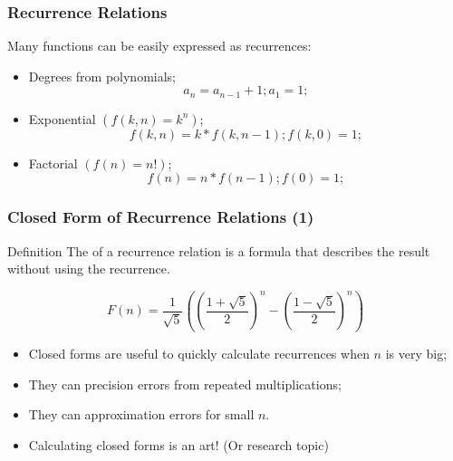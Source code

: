 \documentclass{beamer}
\begin{document}
\begin{frame}
  \frametitle{Recurrence Relations}
  \begin{block}{}
    {\small Many functions can be easily expressed as recurrences:}
  \end{block}
  \begin{itemize}
  \item Degrees from polynomials;
    \begin{equation*}
      a_n = a_{n-1} + 1; a_1 = 1;
    \end{equation*}
  \item Exponential $(f(k,n) = k^n)$;
    \begin{equation*}
      f(k,n) = k*f(k,n-1); f(k,0) = 1;
    \end{equation*}
  \item Factorial $(f(n) = n!)$;
    \begin{equation*}
      f(n) = n*f(n-1); f(0) = 1;
    \end{equation*}
  \end{itemize}
\end{frame}

\begin{frame}
  \frametitle{Closed Form of Recurrence Relations (1)}
  \begin{block}{Definition}
    {\small
    The  of a recurrence relation is a formula
    that describes the result without using the recurrence.
    }
  \end{block}
  \begin{equation*}
     F(n) = \frac{1}{\sqrt{5}}\left(\left(\frac{1+\sqrt{5}}{2}\right)^n - \left(\frac{1-\sqrt{5}}{2}\right)^n\right)
  \end{equation*}
  \vfill
  {\small
  \begin{itemize}    
  \item Closed forms are useful to quickly calculate recurrences when
    $n$ is very big;
  \item They can  precision errors from repeated
    multiplications;
  \item They can  approximation errors for small $n$.
  \item Calculating closed forms is an art! (Or research topic)
  \end{itemize}}
\end{frame}
\end{document}
